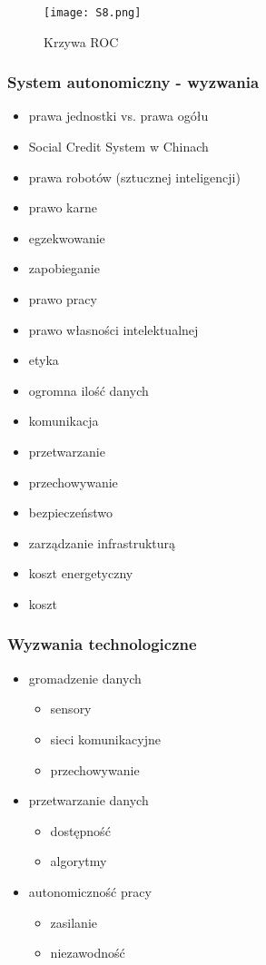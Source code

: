 \begin{figure}[H]
	\centering
	\texttt{[image: S8.png]}
	\caption{Krzywa ROC}
\end{figure}

\subsubsection{System autonomiczny - wyzwania}

\begin{itemize}
	\item prawa jednostki vs. prawa ogółu
	\item Social Credit System w Chinach
	\item prawa robotów (sztucznej inteligencji)
	\item prawo karne
	\item egzekwowanie
	\item zapobieganie
	\item prawo pracy
	\item prawo własności intelektualnej
	\item etyka
	\item ogromna ilość danych
	\item komunikacja
	\item przetwarzanie
	\item przechowywanie
	\item bezpieczeństwo
	\item zarządzanie infrastrukturą
	\item koszt energetyczny
	\item koszt
\end{itemize}

\subsubsection{Wyzwania technologiczne}

\begin{itemize}
	\item gromadzenie danych
	\begin{itemize}
		\item sensory
		\item sieci komunikacyjne
		\item przechowywanie
	\end{itemize}
	\item przetwarzanie danych
	\begin{itemize}
		\item dostępność
		\item algorytmy
	\end{itemize}
	\item autonomiczność pracy
	\begin{itemize}
		\item zasilanie
		\item niezawodność
	\end{itemize}
\end{itemize}

